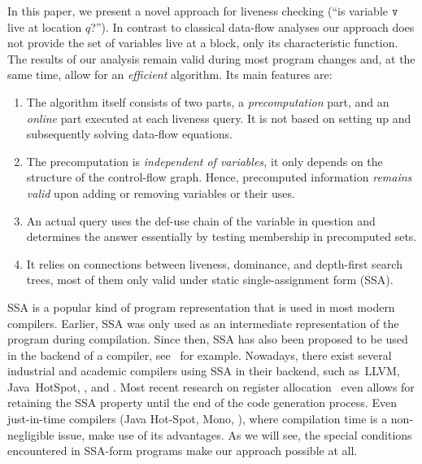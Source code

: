 In this paper, we present a novel approach for liveness checking (``is variable $\mathtt{v}$ live at location $q$?'').
In contrast to classical data-flow analyses our approach does not provide the set of variables live at a block, only its characteristic function.
The results of our analysis remain valid during most program changes and, at the same time, allow for an \emph{efficient} algorithm.
Its main features are:
\begin{enumerate}
	\item
	The algorithm itself consists of two parts, a \emph{precomputation} part, and an \emph{online} part executed at each liveness query.
	It is not based on setting up and subsequently solving data-flow equations.

	\item
	The precomputation is \emph{independent of variables,} it only depends on the structure of the control-flow graph.
	Hence, precomputed information \emph{remains valid} upon adding or removing variables or their uses.

	\item
	An actual query uses the def-use chain of the variable in question and determines the answer essentially by testing membership in precomputed sets.

	\item
	It relies on connections between liveness, dominance, and depth-first search trees, most of them only valid under static single-assignment form (SSA).
\end{enumerate}

SSA is a popular kind of program representation that is used in most modern compilers.
Earlier, SSA was only used as an intermediate representation of the program during compilation.
Since then, SSA has also been proposed to be used in the backend of a compiler, see~\cite{leung:ssamach} for example.
Nowadays, there exist several industrial and academic compilers using SSA in their backend, such as~LLVM, Java~HotSpot, \lao \cite{bdd:2000:lao}, and \firm.
Most recent research on register allocation~\cite{bouchez:lcpc,brisk:2005:poly,HGG:2006:RA_SSA,pereira:2005:chordal} even allows for retaining the SSA property until the end of the code generation process.
Even just-in-time compilers (Java Hot-Spot, Mono, \lao), where compilation time is a non-negligible issue, make use of its advantages.
As we will see, the special conditions encountered in SSA-form programs make our approach possible at all. 

